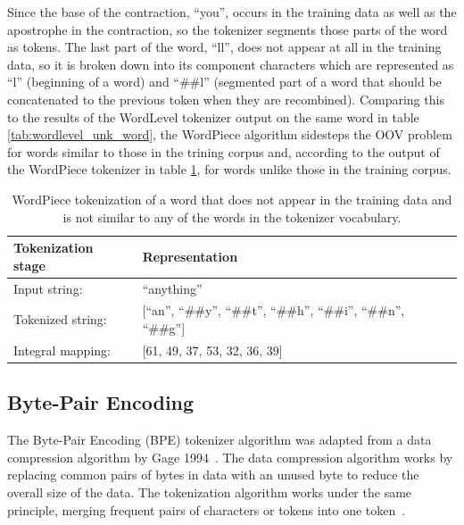 \documentclass[12pt]{article}
\begin{document}
\noindent
Since the base of the contraction, ``you'', occurs in the training data as well as the apostrophe in the contraction, so the tokenizer segments those
parts of the word as tokens. The last part of the word, ``ll'', does not appear at all in the training data, so it is broken down into its component
characters which are represented as ``l'' (beginning of a word) and ``\#\#l'' (segmented part of a word that should be concatenated to the previous
token when they are recombined). Comparing this to the results of the WordLevel tokenizer output on the same word in table
\ref{tab:wordlevel_unk_word}, the WordPiece algorithm sidesteps the OOV problem for words similar to those in the trining corpus and, according to
the output of the WordPiece tokenizer in table \ref{tab:wordpiece_unk_word}, for words unlike those in the training corpus.

\begin{table}[h!]
    \centering
    \begin{tabular}{l l}
        \toprule
        Tokenization stage & Representation                                                             \\
        \midrule
        Input string:      & ``anything''                                                               \\
        Tokenized string:  & [``an'', ``\#\#y'', ``\#\#t'', ``\#\#h'', ``\#\#i'', ``\#\#n'', ``\#\#g''] \\
        Integral mapping:  & [61, 49, 37, 53, 32, 36, 39]                                               \\
        \bottomrule
    \end{tabular}
    \caption{WordPiece tokenization of a word that does not appear in the training data and is not similar to any of the words in the tokenizer
        vocabulary.}
    \label{tab:wordpiece_unk_word}
\end{table}

\subsection{Byte-Pair Encoding}\label{sec:bpe}
The Byte-Pair Encoding (BPE) tokenizer algorithm was adapted from a data compression algorithm by Gage 1994~\cite{gage_feb94_1994}. The data compression
algorithm works by replacing common pairs of bytes in data with an unused byte to reduce the overall size of the data. The tokenization algorithm
works under the same principle, merging frequent pairs of characters or tokens into one token~\cite{sennrich_neural_2016}.
\end{document}
